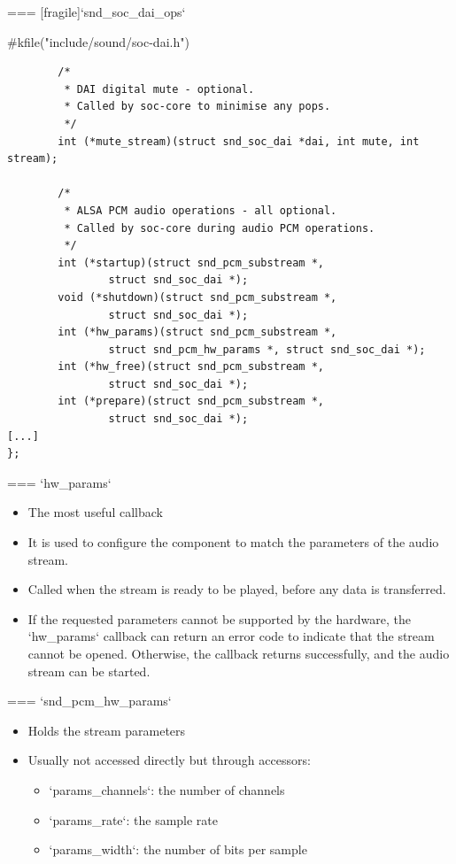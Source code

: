 === [fragile]{`snd_soc_dai_ops`}
  \begin{block}{#kfile("include/sound/soc-dai.h")}
    \fontsize{9}{9}\selectfont
    \begin{verbatim}
        /*
         * DAI digital mute - optional.
         * Called by soc-core to minimise any pops.
         */
        int (*mute_stream)(struct snd_soc_dai *dai, int mute, int stream);

        /*
         * ALSA PCM audio operations - all optional.
         * Called by soc-core during audio PCM operations.
         */
        int (*startup)(struct snd_pcm_substream *,
                struct snd_soc_dai *);
        void (*shutdown)(struct snd_pcm_substream *,
                struct snd_soc_dai *);
        int (*hw_params)(struct snd_pcm_substream *,
                struct snd_pcm_hw_params *, struct snd_soc_dai *);
        int (*hw_free)(struct snd_pcm_substream *,
                struct snd_soc_dai *);
        int (*prepare)(struct snd_pcm_substream *,
                struct snd_soc_dai *);
[...]
};
    \end{verbatim}
  \end{block}


=== {`hw_params`}
  \begin{itemize}
  \item The most useful callback
  \item It is used to configure the component to match the parameters
    of the audio stream.
  \item Called when the stream is ready to be played, before any data
    is transferred.
  \item If the requested parameters cannot be supported by the
    hardware, the `hw_params` callback can return an error code
    to indicate that the stream cannot be opened. Otherwise, the
    callback returns successfully, and the audio stream can be
    started.
  \end{itemize}


=== {`snd_pcm_hw_params`}
  \begin{itemize}
  \item Holds the stream parameters
  \item Usually not accessed directly but through accessors:
    \begin{itemize}
    \item `params_channels`: the number of channels
    \item `params_rate`: the sample rate
    \item `params_width`: the number of bits per sample
    \end{itemize}
  \end{itemize}


